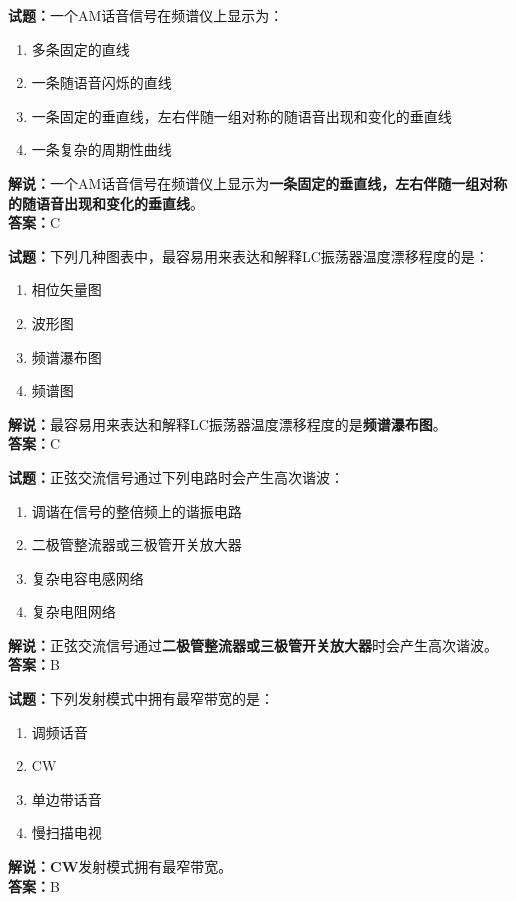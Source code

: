 \documentclass{ctexbook}
\begin{document}
\bigskip


\noindent\textbf{试题：}一个AM话音信号在频谱仪上显示为：
\begin{enumerate}[leftmargin=3em]
\item 多条固定的直线
\item 一条随语音闪烁的直线
\item 一条固定的垂直线，左右伴随一组对称的随语音出现和变化的垂直线
\item 一条复杂的周期性曲线
\end{enumerate}
\noindent\textbf{解说：}一个AM话音信号在频谱仪上显示为\textbf{一条固定的垂直线，左右伴随一组对称的随语音出现和变化的垂直线}。\\\noindent\textbf{答案：}C



\bigskip


\noindent\textbf{试题：}下列几种图表中，最容易用来表达和解释LC振荡器温度漂移程度的是：
\begin{enumerate}[leftmargin=3em]
\item 相位矢量图
\item 波形图
\item 频谱瀑布图
\item 频谱图
\end{enumerate}
\noindent\textbf{解说：}最容易用来表达和解释LC振荡器温度漂移程度的是\textbf{频谱瀑布图}。\\\noindent\textbf{答案：}C



\bigskip


\noindent\textbf{试题：}正弦交流信号通过下列电路时会产生高次谐波：
\begin{enumerate}[leftmargin=3em]
\item 调谐在信号的整倍频上的谐振电路
\item 二极管整流器或三极管开关放大器
\item 复杂电容电感网络
\item 复杂电阻网络
\end{enumerate}
\noindent\textbf{解说：}正弦交流信号通过\textbf{二极管整流器或三极管开关放大器}时会产生高次谐波。\\\noindent\textbf{答案：}B



\bigskip


\noindent\textbf{试题：}下列发射模式中拥有最窄带宽的是：
\begin{enumerate}[leftmargin=3em]
\item 调频话音
\item CW
\item 单边带话音
\item 慢扫描电视
\end{enumerate}
\noindent\textbf{解说：}\textbf{CW}发射模式拥有最窄带宽。\\\noindent\textbf{答案：}B
\end{document}

